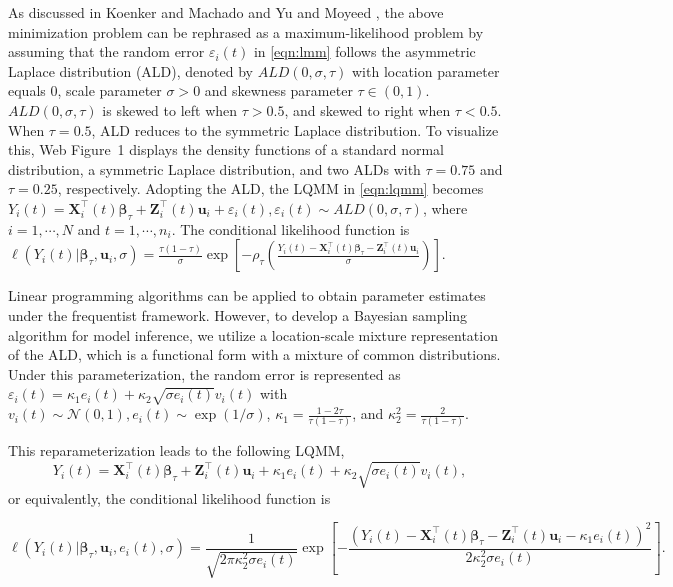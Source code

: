 \documentclass[Crown, sagev, times, doublespace]{sagej}
\begin{document}
As discussed in Koenker and Machado \cite{koenker1999goodness} and Yu and Moyeed \cite{yu2001bayesian}, the above minimization problem can be rephrased as a maximum-likelihood problem by assuming that the random error $\varepsilon_{i}(t)$ in \eqref{eqn:lmm} follows the asymmetric Laplace distribution (ALD), denoted by $ALD(0, \sigma, \tau)$ with location parameter equals 0, scale parameter $\sigma>0$ and skewness parameter $\tau\in (0, 1)$. $ALD(0, \sigma, \tau)$ is skewed to left when $\tau>0.5$, and skewed to right when $\tau<0.5$. When $\tau=0.5$, ALD reduces to the symmetric Laplace distribution. To visualize this, Web Figure~1 displays the density functions of a standard normal distribution, a symmetric Laplace distribution, and two ALDs with $\tau=0.75$ and $\tau=0.25$, respectively. Adopting the ALD, the LQMM in \eqref{eqn:lqmm} becomes $Y_{i}(t) ={\boldsymbol X}_{i}^{\top}(t) \boldsymbol{\beta}_{\tau}+ {\boldsymbol Z}_{i}^{\top}(t)\boldsymbol{u}_i + \varepsilon_{i}(t), \varepsilon_{i}(t)\sim ALD(0, \sigma, \tau)$, where $i=1, \cdots, N$ and $t=1,\cdots, n_i$. The conditional likelihood function is $\ell(Y_{i}(t)|\boldsymbol{\beta}_{\tau},\boldsymbol{u}_i,\sigma)=\frac{\tau(1-\tau)}{\sigma}\exp\left[-\rho_{\tau}\left(\frac{Y_{i}(t)-{\boldsymbol X}_{i}^{\top}(t)\boldsymbol{\beta}_{\tau}-{\boldsymbol Z}_{i}^{\top}(t)\boldsymbol{u}_i}{\sigma}\right)\right]$.

Linear programming algorithms can be applied to obtain parameter estimates under the frequentist framework. However, to develop a Bayesian sampling algorithm for model inference, we utilize a location-scale mixture representation of the ALD,\cite{kotz2001laplace} which is a functional form with a mixture of common distributions. Under this parameterization, the random error is represented as $\varepsilon_{i}(t)=\kappa_1e_{i}(t)+\kappa_2\sqrt{\sigma e_{i}(t)}v_{i}(t)$ with $v_{i}(t)\sim \mathcal{N}(0,1), e_{i}(t)\sim\exp(1/\sigma)$, $\kappa_1=\frac{1-2\tau}{\tau(1-\tau)}$, and $\kappa_2^2=\frac{2}{\tau(1-\tau)}$.

This reparameterization leads to the following LQMM,
\begin{equation}\label{eqn:reformald2}
Y_{i}(t)={\boldsymbol X}_{i}^{\top}(t)\boldsymbol{\beta}_{\tau}+{\boldsymbol Z}_{i}^{\top}(t)\boldsymbol{u}_i+\kappa_1e_{i}(t)+\kappa_2\sqrt{\sigma e_{i}(t)}v_{i}(t),
\end{equation}
or equivalently, the conditional likelihood function is

\begin{equation}\label{eqn:lo_sc_lh}
\ell(Y_{i}(t)|\boldsymbol{\beta}_{\tau},\boldsymbol{u}_i,e_{i}(t),\sigma)=\frac{1}{\sqrt{2\pi\kappa_2^2\sigma e_{i}(t)}}\exp\left[-\frac{(Y_{i}(t)-{\boldsymbol X}_{i}^{\top}(t)\boldsymbol{\beta}_{\tau}-{\boldsymbol Z}_{i}^{\top}(t)\boldsymbol{u}_i-\kappa_1e_{i}(t))^2}{2\kappa_2^2\sigma e_{i}(t)}\right].
\end{equation}
\end{document}
